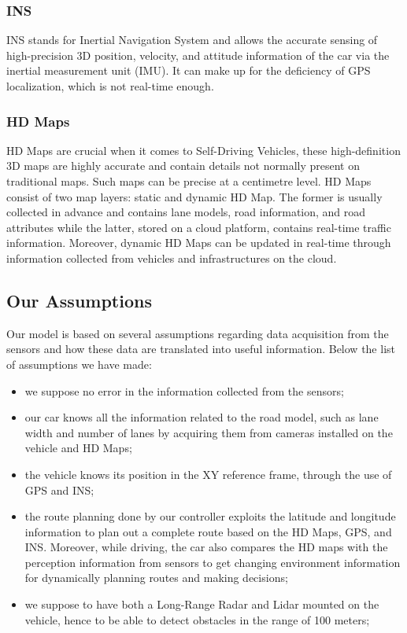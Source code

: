 \subsubsection{INS}
INS stands for Inertial Navigation System and allows the accurate sensing of high-precision 3D position, velocity, and attitude information of the car via the inertial measurement unit (IMU).
It can make up for the deficiency of GPS localization, which is not real-time enough.

\subsubsection{HD Maps}
HD Maps are crucial when it comes to Self-Driving Vehicles, these high-definition 3D maps are highly accurate and contain details not normally present on traditional maps. Such maps can be precise at a centimetre level.
HD Maps consist of two map layers: static and dynamic HD Map.
The former is usually collected in advance and contains lane models, road information, and road attributes while the latter, stored on a cloud platform, contains real-time traffic information. Moreover, dynamic HD Maps can be updated in real-time through information collected from vehicles and infrastructures on the cloud.

\subsection{Our Assumptions}

Our model is based on several assumptions regarding data acquisition from the sensors and how these data are translated into useful information. Below the list of assumptions we have made:
\begin{itemize}
    \item we suppose no error in the information collected from the sensors;
    \item our car knows all the information related to the road model, such as lane width and number of lanes by acquiring them from cameras installed on the vehicle and HD Maps;
    \item the vehicle knows its position in the XY reference frame, through the use of GPS and INS;
    \item the route planning done by our controller exploits the latitude and longitude information to plan out a complete route based on the HD Maps, GPS, and INS. Moreover, while driving, the car also compares the HD maps with the perception information from sensors to get changing environment information for dynamically planning routes and making decisions;
    \item we suppose to have both a Long-Range Radar and Lidar mounted on the vehicle, hence to be able to detect obstacles in the range of 100 meters;
\end{itemize}

